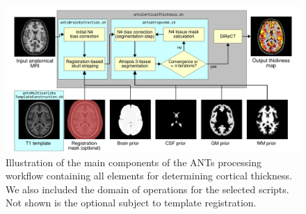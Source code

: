 %
%



\begin{figure}
  \centering
  \includegraphics[width=140mm]{Figures/Kapowski_pipeline2.pdf}
  \caption{Illustration of the main components of the ANTs processing 
  workflow containing all elements for determining cortical thickness. 
  We also included the domain of operations for the selected scripts.
  Not shown is the optional subject to template registration.}
  \label{fig:pipeline}
\end{figure}

